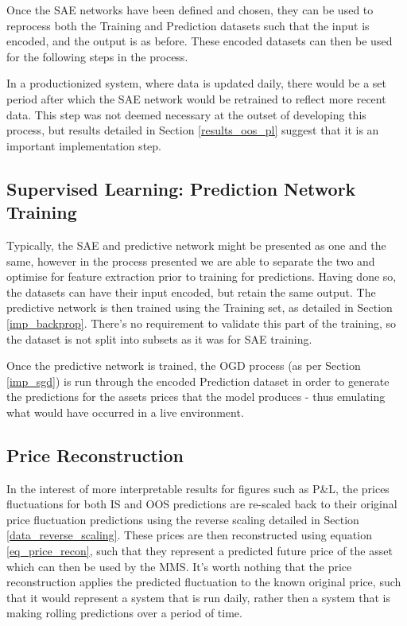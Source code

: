 \documentclass[a4paper,11pt,oneside]{article}
\theoremstyle{plain}
\theoremstyle{definition}
\begin{document}
	Once the SAE networks have been defined and chosen, they can be used to reprocess both the Training and Prediction datasets such that the input is encoded, and the output is as before. These encoded datasets can then be used for the following steps in the process. \newline
	
	In a productionized system, where data is updated daily, there would be a set period after which the SAE network would be retrained to reflect more recent data. This step was not deemed necessary at the outset of developing this process, but results detailed in Section \ref{results_oos_pl} suggest that it is an important implementation step.\newline
	
	\subsection{Supervised Learning: Prediction Network Training}\label{proc_predictionnetwork}
	
	Typically, the SAE and predictive network might be presented as one and the same, however in the process presented we are able to separate the two and optimise for feature extraction prior to training for predictions. Having done so, the datasets can have their input encoded, but retain the same output. The predictive network is then trained using the Training set, as detailed in Section \ref{imp_backprop}. There's no requirement to validate this part of the training, so the dataset is not split into subsets as it was for SAE training. \newline
	
	Once the predictive network is trained, the OGD process (as per Section \ref{imp_sgd}) is run through the encoded Prediction dataset in order to generate the predictions for the assets prices that the model produces - thus emulating what would have occurred in a live environment. \newline
	
	\subsection{Price Reconstruction}\label{proc_precerecon}
	
	In the interest of more interpretable results for figures such as P\&L, the prices fluctuations for both IS and OOS predictions are re-scaled back to their original price fluctuation predictions using the reverse scaling detailed in Section \ref{data_reverse_scaling}. These prices are then reconstructed using equation \eqref{eq_price_recon}, such that they represent a predicted future price of the asset which can then be used by the MMS. It's worth nothing that the price reconstruction applies the predicted fluctuation to the known original price, such that it would represent a system that is run daily, rather then a system that is making rolling predictions over a period of time. 
	
\end{document}
